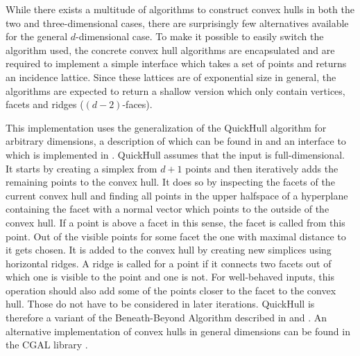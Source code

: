 While there exists a multitude of algorithms to construct convex hulls in both the two and three-dimensional cases, there are surprisingly few alternatives available for the general $d$-dimensional case.
To make it possible to easily switch the algorithm used, the concrete convex hull algorithms are encapsulated and are required to implement a simple interface which takes a set of points and returns an incidence lattice.
Since these lattices are of exponential size in general, the algorithms are expected to return a shallow version which only contain vertices, facets and ridges ($(d-2)$-faces).

This implementation uses the generalization of the QuickHull algorithm for arbitrary dimensions, a description of which can be found in \cite{barber1996quickhull} and an interface to which is implemented in .
QuickHull assumes that the input is full-dimensional.
It starts by creating a simplex from $d + 1$ points and then iteratively adds the remaining points to the convex hull.
It does so by inspecting the facets of the current convex hull and finding all points in the upper halfspace of a hyperplane containing the facet with a normal vector which points to the outside of the convex hull.
If a point is above a facet in this sense, the facet is called  from this point.
Out of the visible points for some facet the one with maximal distance to it gets chosen.
It is added to the convex hull by creating new simplices using horizontal ridges.
A ridge is called  for a point if it connects two facets out of which one is visible to the point and one is not.
For well-behaved inputs, this operation should also add some of the points closer to the facet to the convex hull.
Those do not have to be considered in later iterations.
QuickHull is therefore a variant of the Beneath-Beyond Algorithm described in \cite{grunbaum1963measures} and \cite{clarkson1989applications}.
An alternative implementation of convex hulls in general dimensions can be found in the CGAL library \cite{cgal:eb-15a}.


